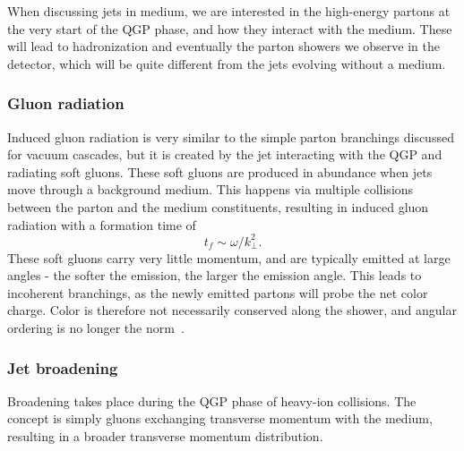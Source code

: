 \documentclass[main.tex]{subfiles}
\begin{document}
When discussing jets in medium, we are interested in the high-energy partons at the very start of the QGP phase, and how they interact with the medium. These will lead to hadronization and eventually the parton showers we observe in the detector, which will be quite different from the jets evolving without a medium.

\subsubsection*{Gluon radiation}
Induced gluon radiation is very similar to the simple parton branchings discussed for vacuum cascades, but it is created by the jet interacting with the QGP and radiating soft gluons. These soft gluons are produced in abundance when jets move through a background medium. This happens via multiple collisions between the parton and the medium constituents, resulting in induced gluon radiation with a formation time of
\begin{equation}\label{eqn: induced_gluon_radiation_formationtime}
    t_f\sim \omega/k_\perp^2.
\end{equation}
These soft gluons carry very little momentum, and are typically emitted at large angles - the softer the emission, the larger the emission angle.
This leads to incoherent branchings, as the newly emitted partons will probe the net color charge. Color is therefore not necessarily conserved along the shower, and angular ordering is no longer the norm~\cite{medium_induced_gluon_branching}. 

\subsubsection*{Jet broadening}
Broadening takes place during the QGP phase of heavy-ion collisions. The concept is simply gluons exchanging transverse momentum with the medium, resulting in a broader transverse momentum distribution. 
\end{document}
